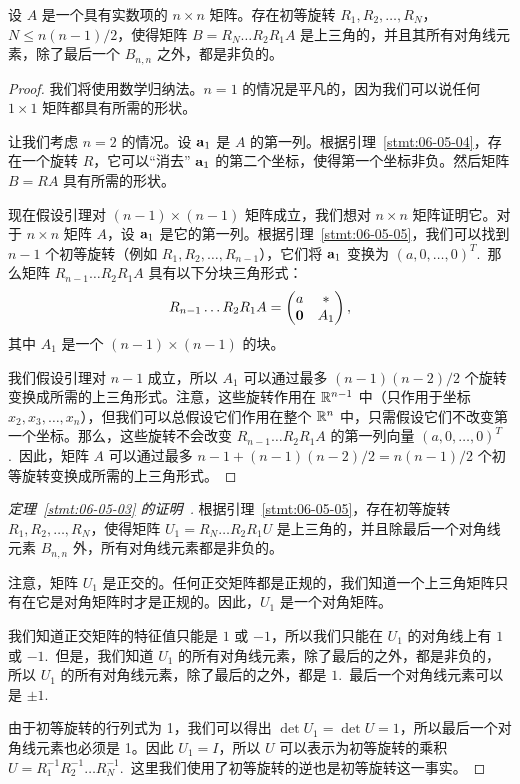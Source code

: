 \begin{lemma}\label{stmt:06-05-06}设 $A$ 是一个具有实数项的 $n \times n$ 矩阵。存在初等旋转 $R_1, R_2, \dots, R_N$，$N \le n(n-1)/2$，使得矩阵 $B = R_N \dots R_2 R_1 A$ 是上三角的，并且其所有对角线元素，除了最后一个 $B_{n,n}$ 之外，都是非负的。\end{lemma}

\begin{proof} 我们将使用数学归纳法。$n=1$ 的情况是平凡的，因为我们可以说任何 $1 \times 1$ 矩阵都具有所需的形状。

让我们考虑 $n=2$ 的情况。设 $\mathbf{a}_1$ 是 $A$ 的第一列。根据引理~\ref{stmt:06-05-04}，存在一个旋转 $R$，它可以“消去” $\mathbf{a}_1$ 的第二个坐标，使得第一个坐标非负。然后矩阵 $B = RA$ 具有所需的形状。

现在假设引理对 $(n-1) \times (n-1)$ 矩阵成立，我们想对 $n \times n$ 矩阵证明它。对于 $n \times n$ 矩阵 $A$，设 $\mathbf{a}_1$ 是它的第一列。根据引理~\ref{stmt:06-05-05}，我们可以找到 $n-1$ 个初等旋转（例如 $R_1, R_2, \dots, R_{n-1}$），它们将 $\mathbf{a}_1$ 变换为 $(a, 0, \dots, 0)^T$.~那么矩阵 $R_{n-1} \dots R_2 R_1 A$ 具有以下分块三角形式：
$$R_{n-1} \dots R_2 R_1 A = \begin{pmatrix} a & * \\ \mathbf{0} & A_1 \end{pmatrix},$$
其中 $A_1$ 是一个 $(n-1) \times (n-1)$ 的块。

我们假设引理对 $n-1$ 成立，所以 $A_1$ 可以通过最多 $(n-1)(n-2)/2$ 个旋转变换成所需的上三角形式。注意，这些旋转作用在 $\mathbb{R}^{n-1}$ 中（只作用于坐标 $x_2, x_3, \dots, x_n$），但我们可以总假设它们作用在整个 $\mathbb{R}^n$ 中，只需假设它们不改变第一个坐标。那么，这些旋转不会改变 $R_{n-1} \dots R_2 R_1 A$ 的第一列向量 $(a, 0, \dots, 0)^T$.~因此，矩阵 $A$ 可以通过最多 $n-1 + (n-1)(n-2)/2 = n(n-1)/2$ 个初等旋转变换成所需的上三角形式。\end{proof}

\begin{proof}[\normalfont\heiti 定理~\ref{stmt:06-05-03} 的证明~\nopunct]根据引理~\ref{stmt:06-05-05}，存在初等旋转 $R_1, R_2, \dots, R_N$，使得矩阵 $U_1 = R_N \dots R_2 R_1 U$ 是上三角的，并且除最后一个对角线元素 $B_{n,n}$ 外，所有对角线元素都是非负的。

注意，矩阵 $U_1$ 是正交的。任何正交矩阵都是正规的，我们知道一个上三角矩阵只有在它是对角矩阵时才是正规的。因此，$U_1$ 是一个对角矩阵。

我们知道正交矩阵的特征值只能是 $1$ 或 $-1$，所以我们只能在 $U_1$ 的对角线上有 $1$ 或 $-1$.~但是，我们知道 $U_1$ 的所有对角线元素，除了最后的之外，都是非负的，所以 $U_1$ 的所有对角线元素，除了最后的之外，都是 $1$.~最后一个对角线元素可以是 $\pm 1$.~

由于初等旋转的行列式为 1，我们可以得出 $\det U_1 = \det U = 1$，所以最后一个对角线元素也必须是 1。因此 $U_1 = I$，所以 $U$ 可以表示为初等旋转的乘积 $U = R_1^{-1} R_2^{-1} \dots R_N^{-1}$.~这里我们使用了初等旋转的逆也是初等旋转这一事实。\end{proof}

